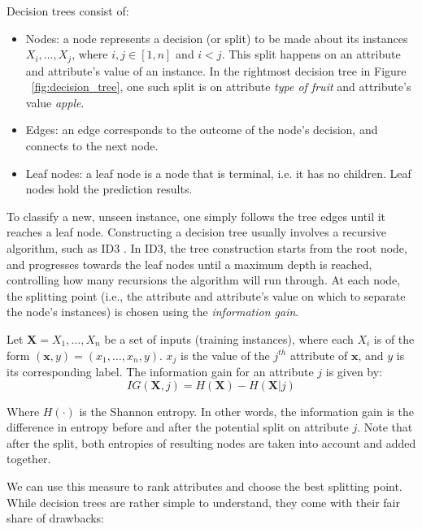 Decision trees consist of:

\begin{itemize}
	\item Nodes: a node represents a decision (or split) to be made about its instances $X_i,\dots,X_j$, where $i, j \in [1,n]$ and $i < j$. This split happens on an attribute and attribute's value of an instance. In the rightmost decision tree in Figure ~\ref{fig:decision_tree}, one such split is on attribute \textit{type of fruit} and attribute's value \textit{apple}.
	\item Edges: an edge corresponds to the outcome of the node's decision, and connects to the next node.
	\item Leaf nodes: a leaf node is a node that is terminal, i.e. it has no children. Leaf nodes hold the prediction results.
\end{itemize}

To classify a new, unseen instance, one simply follows the tree edges until it reaches a leaf node. Constructing a decision tree usually involves a recursive algorithm, such as ID3 \cite{quinlan}. In ID3, the tree construction starts from the root node, and progresses towards the leaf nodes until a maximum depth is reached, controlling how many recursions the algorithm will run through. At each node, the splitting point (i.e., the attribute and attribute's value on which to separate the node's instances) is chosen using the \textit{information gain}.

\begin{definition}
	Let $\textbf{X} = X_1, \dots, X_n$ be a set of inputs (training instances), where each $X_i$ is of the form $(\textbf{x}, y) = (x_1, \dots,x_n,y)$. $x_j$ is the value of the $j^{th}$ attribute of $\textbf{x}$, and $y$ is its corresponding label. The information gain for an attribute $j$ is given by:
	$$IG(\textbf{X}, j) = H(\textbf{X}) - H(\textbf{X}|j)$$
	
	Where $H(\cdot)$ is the Shannon entropy. In other words, the information gain is the difference in entropy before and after the potential split on attribute $j$. Note that after the split, both entropies of resulting nodes are taken into account and added together.
\end{definition}

We can use this measure to rank attributes and choose the best splitting point. While decision trees are rather simple to understand, they come with their fair share of drawbacks:

